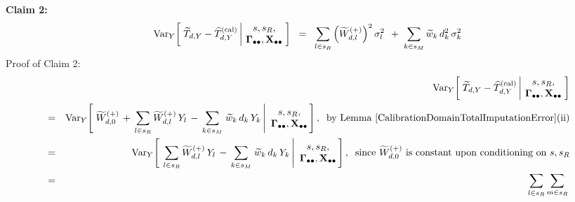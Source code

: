 \begin{enumerate}
    \vskip 0.5cm
    \textbf{Claim 2:}\quad
    \begin{equation*}
    \textnormal{Var}_{Y}\!\left[\;
        \widetilde{T}_{d,Y} - \widehat{T}^{\textnormal{(cal)}}_{d,Y}
        \left\vert\!
        \begin{array}{c} s,s_{R}, \\ \mathbf{\Gamma}_{\bullet\bullet},\mathbf{X}_{\bullet\bullet} \end{array}
        \right.
        \!\!\right]
    \;\; = \;\;
        \underset{l \in s_{R}}{\sum}
            \left(\widetilde{W}^{(+)}_{d,l}\right)^{2}\sigma_{l}^{2}
        \,\;+\;
        \underset{k \in s_{M}}{\sum}\,
            \widetilde{w}_{k}\,d_{k}^{2}\,\sigma_{k}^{2}
    \end{equation*}
    \vskip 0.1cm
    \noindent
    Proof of Claim 2:\;\;
    \begin{eqnarray*}
    &&
        \Var_{Y}\!\left[\;
            \widetilde{T}_{d,Y} - \widehat{T}^{\textnormal{(cal)}}_{d,Y}
            \left\vert\!
            \begin{array}{c} s,s_{R}, \\ \Gdotdot,\Xobs \end{array}
            \right.
            \!\!\right]
    \\
    & = &
        \Var_{Y}\!\left[\,
            \left.
            \widetilde{W}^{(+)}_{d,0}
            \,+\,
            \underset{l \in s_{R}}{\sum}\,\widetilde{W}^{(+)}_{d,l}\,Y_{l}
            \,-\,
            \underset{k \in s_{M}}{\sum}\;\widetilde{w}_{k}\,d_{k}\,Y_{k}
            \,\right\vert\!
            \begin{array}{c} s,s_{R}, \\ \Gdotdot,\Xobs \end{array}
            \!\!\right],
        \;\;
        \textnormal{by Lemma \ref{CalibrationDomainTotalImputationError}(ii)}
    \\
    & = &
        \Var_{Y}\!\left[\;
            \left.
            \underset{l \in s_{R}}{\sum}\,\widetilde{W}^{(+)}_{d,l}\,Y_{l}
            \,-\,
            \underset{k \in s_{M}}{\sum}\;\widetilde{w}_{k}\,d_{k}\,Y_{k}
            \,\right\vert\!
            \begin{array}{c} s,s_{R}, \\ \Gdotdot,\Xobs \end{array}
            \!\!\right],
        \;\;
        \textnormal{since $\widetilde{W}^{(+)}_{d,0}$ is constant upon conditioning on $s, s_{R}$}
    \\
    & = &
        \underset{l \in s_{R}}{\sum}\,
        \underset{m \in s_{R}}{\sum}\,

\end{eqnarray*}
\end{enumerate}
